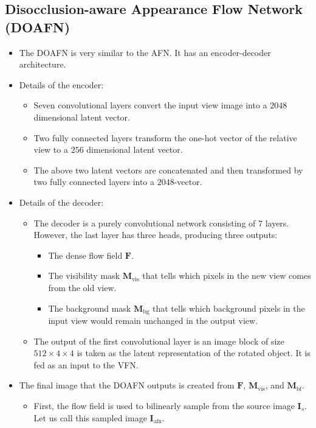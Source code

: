 \documentclass[10pt]{article}
\newcommand{\ve}[1]{\pmb{#1}}
\newcommand{\mrm}[1]{\mathrm{#1}}
\begin{document}
  \subsection{Disocclusion-aware Appearance Flow Network (DOAFN)}

  \begin{itemize}
  	\item The DOAFN is very similar to the AFN. It has an encoder-decoder architecture.

  	\item Details of the encoder:
  	\begin{itemize}
  		\item Seven convolutional layers convert the input view image into a $2048$ dimensional latent vector.

  		\item Two fully connected layers transform the one-hot vector of the relative view to a $256$ dimensional latent vector.

  		\item The above two latent vectors are concatenated and then transformed by two fully connected layers into a $2048$-vector.  		
  	\end{itemize}

  	\item Details of the decoder:
  	\begin{itemize}
  		\item The decoder is a purely convolutional network consisting of 7 layers. However, the last layer has three heads, producing three outputs:
  		\begin{itemize}
  			\item The dense flow field $\ve{F}$.
  			\item The visibility mask $\ve{M}_{\mrm{vis}}$ that tells which pixels in the new view comes from the old view.
  			\item The background mask $\ve{M}_{\mrm{bg}}$ that tells which background pixels in the input view would remain unchanged in the output view.
  		\end{itemize}

  		\item The output of the first convolutional layer is an image block of size $512 \times 4 \times 4$ is taken as the latent representation of the rotated object. It is fed as an input to the VFN.
  	\end{itemize}

  	\item The final image that the DOAFN outputs is created from $\ve{F}$, $\ve{M}_{\mrm{vis}}$, and $\ve{M}_{\mrm{bf}}$.
  	\begin{itemize}
  		\item First, the flow field is used to bilinearly sample from the source image $\ve{I}_s$. Let us call this sampled image $\ve{I}_{\mrm{afn}}$.


\end{itemize}
\end{itemize}
\end{document}

